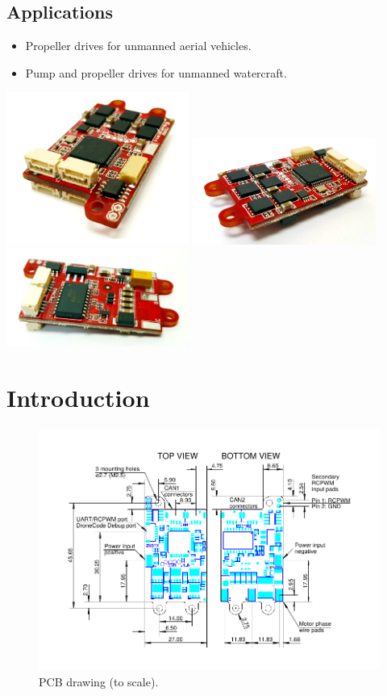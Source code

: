 \documentclass{zubaxdoc}
\begin{document}
\begin{titlepage}
\BeginRightColumn
\section*{Applications}

\begin{itemize}
    \item Propeller drives for unmanned aerial vehicles.
    \item Pump and propeller drives for unmanned watercraft.
\end{itemize}

\centering
\includegraphics[width=0.45\textwidth]{image}
\includegraphics[width=0.45\textwidth]{image2}
\includegraphics[width=0.45\textwidth]{bottom}

\end{titlepage}

\tableofcontents
\listoffigures
\listoftables

\mainmatter

\chapter{Introduction}

\begin{figure}
\centerline{\includegraphics[width=1\textwidth]{drawing}}
\caption{PCB drawing (to scale).}
\end{figure}
\end{document}
